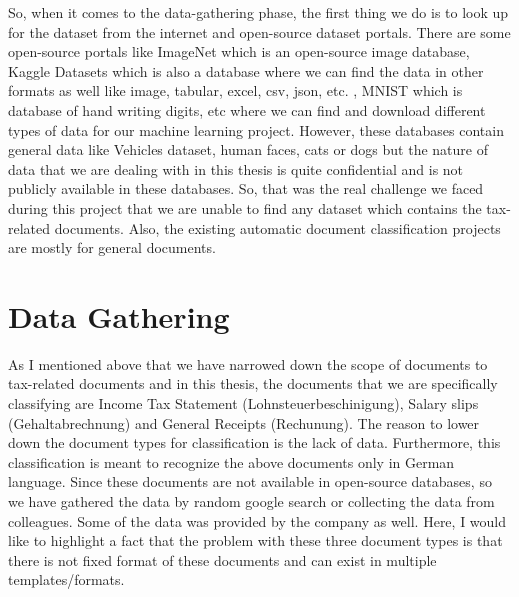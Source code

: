 \par
So, when it comes to the data-gathering phase, the first thing we do is to look up for the dataset from the internet and open-source dataset portals. There are some open-source portals like ImageNet \cite{imgnet} which is an open-source image database, Kaggle Datasets \cite{kaggle_dataset} which is also a database where we can find the data in other formats as well like image, tabular, excel, csv, json, etc. , MNIST \cite{mnist} which is database of hand writing digits, etc where we can find and download different types of data for our machine learning project. However, these databases contain general data like Vehicles dataset, human faces, cats or dogs but the nature of data that we are dealing with in this thesis is quite confidential and is not publicly available in these databases. So, that was the real challenge we faced during this project that we are unable to find any dataset which contains the tax-related documents. Also, the existing automatic document classification projects are mostly for general documents.
\section{Data Gathering}
\par
As I mentioned above that we have narrowed down the scope of documents to tax-related documents and in this thesis, the documents that we are specifically classifying are Income Tax Statement (Lohnsteuerbeschinigung), Salary slips (Gehaltabrechnung) and General Receipts (Rechunung). The reason to lower down the document types for classification is the lack of data. Furthermore, this classification is meant to recognize the above documents only in German language. Since these documents are not available in open-source databases, so we have gathered the data by random google search or collecting the data from colleagues. Some of the data was provided by the company as well. Here, I would like to highlight a fact that the problem with these three document types is that there is not fixed format of these documents and can exist in multiple templates/formats.
